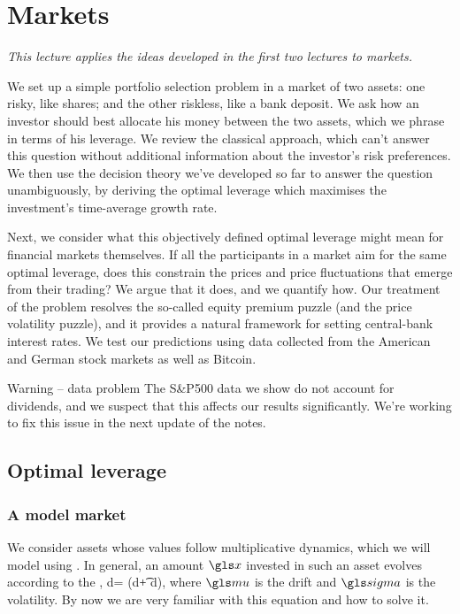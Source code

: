 \newpage

\section{Markets}

{\it This lecture applies the ideas developed in the first two lectures to markets. 

We set up a simple portfolio selection problem in a market of two assets: one risky, like shares; and the other riskless, like a bank deposit. We ask how an investor should best allocate his money between the two assets, which we phrase in terms of his leverage. We review the classical approach, which can't answer this question without additional information about the investor's risk preferences. We then use the decision theory we've developed so far to answer the question unambiguously, by deriving the optimal leverage which maximises the investment's time-average growth rate.

Next, we consider what this objectively defined optimal leverage might mean for financial markets themselves. If all the participants in a market aim for the same optimal leverage, does this constrain the prices and price fluctuations that emerge from their trading? We argue that it does, and we quantify how. Our treatment of the problem resolves the so-called equity premium puzzle (and the price volatility puzzle), and it provides a natural framework for setting central-bank interest rates.
We test our predictions using data collected from the American and German stock markets as well as Bitcoin.
}

\begin{keypts}{Warning -- data problem}
The S\&P500 data we show do not account for dividends, and we suspect that this affects our results significantly. We're working to fix this issue in the next update of the notes.
\end{keypts}

\newpage


\subsection{Optimal leverage}

\subsubsection{A model market}
We consider assets whose values follow multiplicative dynamics, which we will model using \GBM. In general, an amount $\x$ invested in such an asset evolves according to the \SDE,
\be
d\x = \x(\gmu d\t + \gsigma d\gW),
\ee
where $\gmu$ is the drift and $\gsigma$ is the volatility. By now we are very familiar with this equation and how to solve it.

